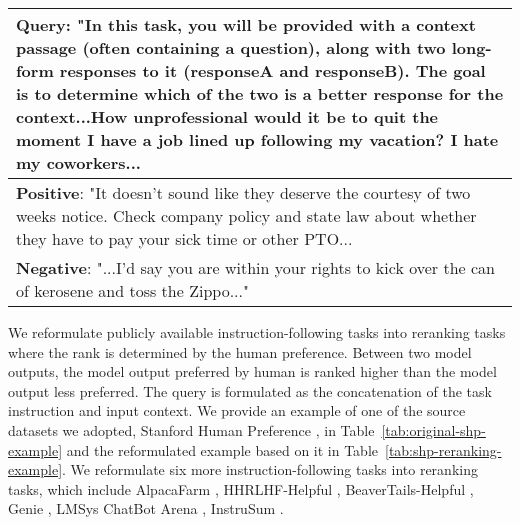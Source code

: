 \begin{table*}[t!]
\centering
\small
\begin{tabular}{p{15.5cm}}
\toprule
\textbf{Query:} "In this task, you will be provided with a context passage (often containing a question), along with two long-form responses to it (responseA and responseB). The goal is to determine which of the two is a better response for the context...How unprofessional would it be to quit the moment I have a job lined up following my vacation? I hate my coworkers... \\ 
\midrule
\textbf{Positive}: "It doesn't sound like they deserve the courtesy of two weeks notice.   Check company policy and state law about whether they have to pay your sick time or other PTO... \\
\midrule
\textbf{Negative}: "...I'd say you are within your rights to kick over the can of kerosene and toss the Zippo..." \\ 
\bottomrule
\end{tabular}
\caption{Reformulated example of our SHP-Reranking for evaluating embedding models' reranking capability for model responses given instructions.}
\label{tab:shp-reranking-example}
\end{table*}

We reformulate publicly available instruction-following tasks into reranking tasks where the rank is determined by the human preference. Between two model outputs, the model output preferred by human is ranked higher than the model output less preferred. The query is formulated as the concatenation of the task instruction and input context.  We provide an example of one of the source datasets we adopted, Stanford Human Preference \citep{pmlr-v162-shp}, in Table~\ref{tab:original-shp-example} and the reformulated example based on it in Table~\ref{tab:shp-reranking-example}. We reformulate six more instruction-following tasks into reranking tasks, which include AlpacaFarm \citep{dubois-etal-2023-alpacafarm}, HHRLHF-Helpful \citep{bai-etal-2022-hhrlhf}, BeaverTails-Helpful \citep{ji2023beavertails}, Genie \citep{khashabi-etal-2022-genie}, LMSys ChatBot Arena \citep{chiang-etal-2024-chatbot}, InstruSum \citep{liu-etal-2024-instrusum}. 





